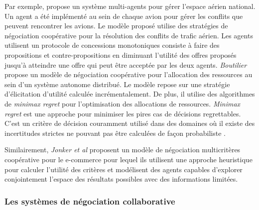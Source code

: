 		Par exemple, \cite{wollkind2004automated} propose un système multi-agents pour gérer l'espace aérien national. Un agent a été implémenté au sein de chaque avion pour gérer les conflits que peuvent rencontrer les avions. Le modèle proposé utilise des stratégies de négociation coopérative pour la résolution des conflits de trafic aérien. Les agents utilisent un protocole de concessions monotoniques \cite{zlotkin1989negotiation} consiste à faire des propositions et contre-propositions en diminuant l'utilité des offres proposés jusqu'à atteindre une offre qui peut être acceptée par les deux agents. 
		 \emph{Boutilier} \cite{boutilier2002cooperative} propose un modèle de négociation coopérative pour l'allocation des ressources au sein d'un système autonome distribué. Le modèle repose sur une stratégie d'élicitation d'utilité calculée incrémentalement.  De plus, il utilise des algorithmes de \textit{minimax regret} pour l'optimisation des allocations de ressources. \textit{Minimax regret} est une approche pour minimiser les pires cas de décisions regrettables. C'est un critère de décision couramment utilisé dans des domaines où il existe des incertitudes strictes ne pouvant pas être calculées de façon probabiliste \cite{borodin2005online}.   
	
		Similairement, \emph{Jonker et al} \cite{jonker2007agent} proposent un modèle de négociation multicritères coopérative pour le e-commerce pour lequel ils utilisent une approche heuristique pour calculer l'utilité des critères et modélisent des agents capables d'explorer conjointement l'espace des résultats possibles avec des informations limitées. 
	
		\subsubsection{Les systèmes de négociation collaborative}
		
